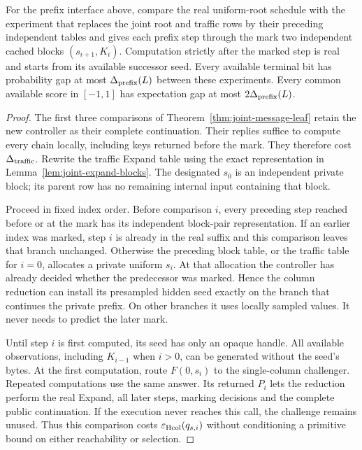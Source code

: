 \begin{theorem}
\label{thm:online-chain-leaf}
For the prefix interface above, compare the real uniform-root schedule
with the experiment that replaces the joint root and traffic rows by
their preceding independent tables and gives each prefix step through
the mark two independent cached blocks $(s_{i+1},K_i)$. Computation
strictly after the marked step is real and starts from its available
successor seed. Every available terminal bit has probability gap at
most $\Delta_{\rm prefix}(L)$ between these experiments. Every common
available score in $[-1,1]$ has expectation gap at most
$2\Delta_{\rm prefix}(L)$.
\end{theorem}
\begin{proof}
The first three comparisons of
Theorem~\ref{thm:joint-message-leaf} retain the new controller as their
complete continuation. Their replies suffice to compute every chain
locally, including keys returned before the mark. They therefore cost
$\Delta_{\rm traffic}$. Rewrite the traffic Expand table using the exact
representation in Lemma~\ref{lem:joint-expand-blocks}.
The designated $s_0$ is an independent private block; its parent row
has no remaining internal input containing that block.

Proceed in fixed index order. Before comparison $i$, every preceding
step reached before or at the mark has its independent block-pair
representation. If an earlier index was marked, step $i$ is already
in the real suffix and this comparison leaves that branch unchanged.
Otherwise the preceding block table, or the traffic table for $i=0$,
allocates a private uniform $s_i$. At that allocation the controller
has already decided whether the predecessor was marked. Hence the
column reduction can install its presampled hidden seed exactly on
the branch that continues the private prefix. On other branches it
uses locally sampled values. It never needs to predict the later mark.

Until step $i$ is first computed, its seed has only an opaque handle.
All available observations, including $K_{i-1}$ when $i>0$, can be
generated without the seed's bytes. At the first computation, route $F(0,s_i)$
to the single-column challenger. Repeated computations use the same
answer. Its returned $P_i$ lets the reduction perform the real Expand,
all later steps, marking decisions and the complete public continuation.
If the execution never reaches this call, the challenge remains unused.
Thus this comparison costs $\varepsilon_{\rm Hcol}(q_{s,i})$ without
conditioning a primitive bound on either reachability or selection.


\end{proof}
